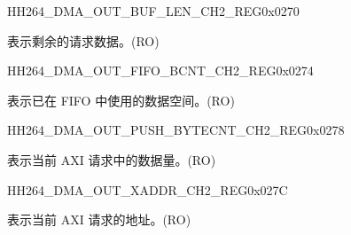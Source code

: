     \begin{register}{H}{H264\_DMA\_OUT\_BUF\_LEN\_CH2\_REG}{0x0270}\label{regdesc:H264DMAOUTBUFLENCH2REG}
    \regnewline%
    \begin{regdesc}\begin{reglist}
    \label{fielddesc:H264DMAOUTCMDFIFOBUFLENHBCH2}\item [H264\_DMA\_OUT\_CMDFIFO\_BUF\_LEN\_HB\_CH2] 表示剩余的请求数据。(RO)
    \end{reglist}\end{regdesc}
    \end{register}
    
    
    \begin{register}{H}{H264\_DMA\_OUT\_FIFO\_BCNT\_CH2\_REG}{0x0274}\label{regdesc:H264DMAOUTFIFOBCNTCH2REG}
    \regnewline%
    \begin{regdesc}\begin{reglist}
    \label{fielddesc:H264DMAOUTCMDFIFOOUTFIFOBCNTCH2}\item [H264\_DMA\_OUT\_CMDFIFO\_OUTFIFO\_BCNT\_CH2] 表示已在 FIFO 中使用的数据空间。(RO)
    \end{reglist}\end{regdesc}
    \end{register}
    
    
    \begin{register}{H}{H264\_DMA\_OUT\_PUSH\_BYTECNT\_CH2\_REG}{0x0278}\label{regdesc:H264DMAOUTPUSHBYTECNTCH2REG}
    \regnewline%
    \begin{regdesc}\begin{reglist}
    \label{fielddesc:H264DMAOUTCMDFIFOPUSHBYTECNTCH2}\item [H264\_DMA\_OUT\_CMDFIFO\_PUSH\_BYTECNT\_CH2] 表示当前 AXI 请求中的数据量。(RO)
    \end{reglist}\end{regdesc}
    \end{register}
    
    
    \begin{register}{H}{H264\_DMA\_OUT\_XADDR\_CH2\_REG}{0x027C}\label{regdesc:H264DMAOUTXADDRCH2REG}
    \regnewline%
    \begin{regdesc}\begin{reglist}
    \label{fielddesc:H264DMAOUTCMDFIFOXADDRCH2}\item [H264\_DMA\_OUT\_CMDFIFO\_XADDR\_CH2] 表示当前 AXI 请求的地址。(RO)
    \end{reglist}\end{regdesc}
    \end{register}
    

